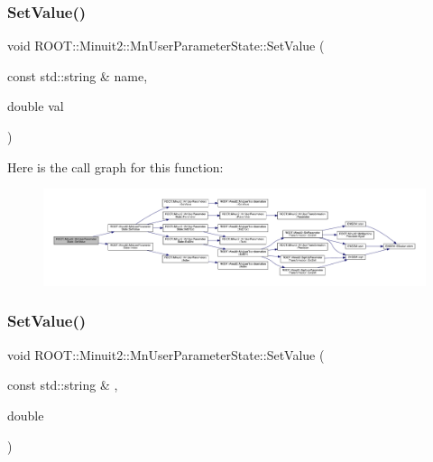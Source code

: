 \mbox{\label{classROOT_1_1Minuit2_1_1MnUserParameterState_abc93cf38ae05fdbb8472c1b5d589e947}} 
\subsubsection{\texorpdfstring{SetValue()}{SetValue()}\hspace{0.1cm}{\footnotesize\ttfamily [4/6]}}
{\footnotesize\ttfamily void R\+O\+O\+T\+::\+Minuit2\+::\+Mn\+User\+Parameter\+State\+::\+Set\+Value (\begin{DoxyParamCaption}\item[{const std\+::string \&}]{name,  }\item[{double}]{val }\end{DoxyParamCaption})}

Here is the call graph for this function\+:
\nopagebreak
\begin{figure}[H]
\begin{center}
\leavevmode
\includegraphics[width=350pt]{d3/de0/classROOT_1_1Minuit2_1_1MnUserParameterState_abc93cf38ae05fdbb8472c1b5d589e947_cgraph}
\end{center}
\end{figure}
\mbox{\label{classROOT_1_1Minuit2_1_1MnUserParameterState_abc93cf38ae05fdbb8472c1b5d589e947}} 
\subsubsection{\texorpdfstring{SetValue()}{SetValue()}\hspace{0.1cm}{\footnotesize\ttfamily [5/6]}}
{\footnotesize\ttfamily void R\+O\+O\+T\+::\+Minuit2\+::\+Mn\+User\+Parameter\+State\+::\+Set\+Value (\begin{DoxyParamCaption}\item[{const std\+::string \&}]{,  }\item[{double}]{ }\end{DoxyParamCaption})}

